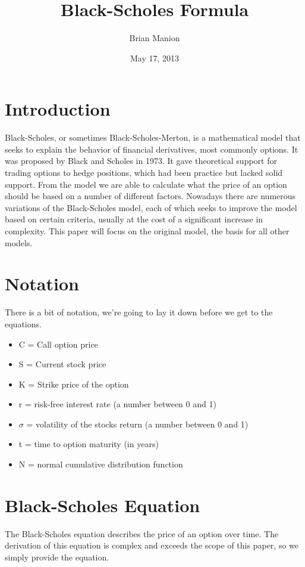 \documentclass{article}
\title{Black-Scholes Formula}
\author{Brian Manion}
\date{May 17, 2013}
\begin{document}
\maketitle
\section{Introduction}
    Black-Scholes, or sometimes Black-Scholes-Merton, is a mathematical model that seeks to explain the behavior of financial derivatives, most commonly options. 
    It was proposed by Black and Scholes in 1973. It gave theoretical support for trading options to hedge positions, 
    which had been practice but lacked solid support. From the model we are able to calculate what the price of an option should be based on a number of 
	different factors. Nowadays there are numerous variations of the Black-Scholes model, each of which seeks to improve the model based on certain criteria, 
	usually at the cost of a significant increase in complexity. This paper will focus on the original model, the basis for all other models.

	
\section{Notation}
There is a bit of notation, we're going to lay it down before we get to the equations.

\begin{itemize}
	\item[] C = Call option price 
	\item[] S = Current stock price
	\item[] K = Strike price of the option
	\item[] r = risk-free interest rate (a number between 0 and 1)
	\item[] $\sigma$ = volatility of the stocks return (a number between 0 and 1)
	\item[] t = time to option maturity (in years)
	\item[] N = normal cumulative distribution function
\end{itemize}


\section{Black-Scholes Equation}
The Black-Scholes equation describes the price of an option over time. The derivation of this equation is complex and exceeds the scope of this paper, 
so we simply provide the equation.
\end{document}
